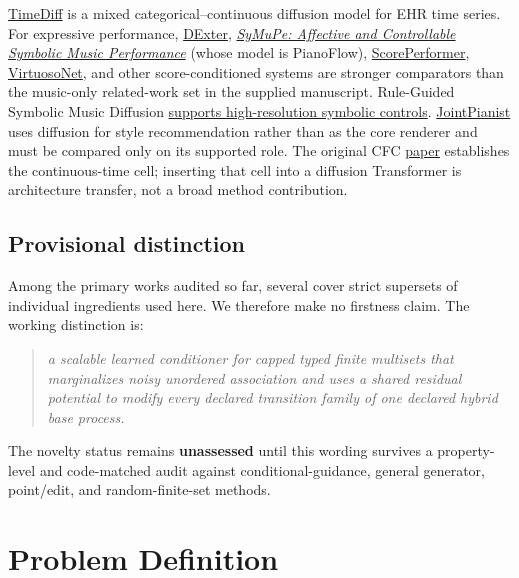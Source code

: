 \documentclass[11pt]{article}
\begin{document}
\href{https://academic.oup.com/jamia/article/31/11/2529/7747780}{TimeDiff} is a mixed categorical--continuous diffusion model for EHR time series. For expressive performance, \href{https://www.mdpi.com/2076-3417/14/15/6543}{DExter}, \href{https://arxiv.org/abs/2511.03425}{\emph{SyMuPe: Affective and Controllable Symbolic Music Performance}} (whose model is PianoFlow), \href{https://archives.ismir.net/ismir2023/paper/000069.pdf}{ScorePerformer}, \href{https://archives.ismir.net/ismir2019/paper/000112.pdf}{VirtuosoNet}, and other score-conditioned systems are stronger comparators than the music-only related-work set in the supplied manuscript. Rule-Guided Symbolic Music Diffusion \href{https://proceedings.mlr.press/v235/huang24g.html}{supports high-resolution symbolic controls}. \href{https://iclr.cc/virtual/2026/poster/10011863}{JointPianist} uses diffusion for style recommendation rather than as the core renderer and must be compared only on its supported role. The original CFC \href{https://www.nature.com/articles/s42256-022-00556-7}{paper} establishes the continuous-time cell; inserting that cell into a diffusion Transformer is architecture transfer, not a broad method contribution.

\subsection{Provisional distinction}
\label{sec:provisional-distinction}

Among the primary works audited so far, several cover strict supersets of individual ingredients used here. We therefore make no firstness claim. The working distinction is:

\begin{quote}
\itshape a scalable learned conditioner for capped typed finite multisets that marginalizes noisy unordered association and uses a shared residual potential to modify every declared transition family of one declared hybrid base process.
\end{quote}

The novelty status remains \textbf{unassessed} until this wording survives a property-level and code-matched audit against conditional-guidance, general generator, point/\allowbreak{}edit, and random-finite-set methods.

\section{Problem Definition}
\label{sec:problem-definition}
\end{document}
